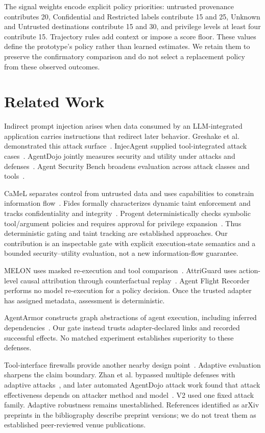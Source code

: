 \documentclass[conference,letterpaper,10pt]{IEEEtran}
\begin{document}
The signal weights encode explicit policy priorities: untrusted provenance contributes 20, Confidential and Restricted labels contribute 15 and 25, Unknown and Untrusted destinations contribute 15 and 30, and privilege levels at least four contribute 15. Trajectory rules add context or impose a score floor. These values define the prototype's policy rather than learned estimates. We retain them to preserve the confirmatory comparison and do not select a replacement policy from these observed outcomes.


\section{Related Work}
Indirect prompt injection arises when data consumed by an LLM-integrated application carries instructions that redirect later behavior. Greshake et al. demonstrated this attack surface~\cite{greshake2023indirect}. InjecAgent supplied tool-integrated attack cases~\cite{zhan2024injecagent}. AgentDojo jointly measures security and utility under attacks and defenses~\cite{debenedetti2024agentdojo}. Agent Security Bench broadens evaluation across attack classes and tools~\cite{zhang2025asb}.

CaMeL separates control from untrusted data and uses capabilities to constrain information flow~\cite{debenedetti2025camel}. Fides formally characterizes dynamic taint enforcement and tracks confidentiality and integrity~\cite{costa2025fides}. Progent deterministically checks symbolic tool/argument policies and requires approval for privilege expansion~\cite{shi2025progent}. Thus deterministic gating and taint tracking are established approaches. Our contribution is an inspectable gate with explicit execution-state semantics and a bounded security--utility evaluation, not a new information-flow guarantee.

MELON uses masked re-execution and tool comparison~\cite{zhu2025melon}. AttriGuard uses action-level causal attribution through counterfactual replay~\cite{he2026attriguard}. Agent Flight Recorder performs no model re-execution for a policy decision. Once the trusted adapter has assigned metadata, assessment is deterministic.

AgentArmor constructs graph abstractions of agent execution, including inferred dependencies~\cite{wang2025agentarmor}. Our gate instead trusts adapter-declared links and recorded successful effects. No matched experiment establishes superiority to these defenses.

Tool-interface firewalls provide another nearby design point~\cite{bhagwatkar2025firewalls}. Adaptive evaluation sharpens the claim boundary. Zhan et al. bypassed multiple defenses with adaptive attacks~\cite{zhan2025adaptive}, and later automated AgentDojo attack work found that attack effectiveness depends on attacker method and model~\cite{hofer2026automated}. V2 used one fixed attack family. Adaptive robustness remains unestablished. References identified as arXiv preprints in the bibliography describe preprint versions; we do not treat them as established peer-reviewed venue publications.
\end{document}
